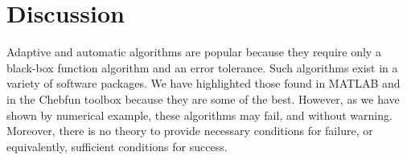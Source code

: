 \documentclass[review]{elsarticle}
\newcommand{\abstol}{\varepsilon}
\theoremstyle{definition}
\newtheorem{exmp}{Example}
\newcommand{\funappxg}{\texttt{funappx\_g}\xspace}
\newcommand{\funming}{\texttt{funmin\_g}\xspace}
\newcommand{\integralg}{\texttt{integral\_g}\xspace}
\begin{document}

\section{Discussion}

Adaptive and automatic algorithms are popular because they require only a
black-box function algorithm and an error tolerance. Such algorithms exist in a
variety of software packages. We have highlighted those found in MATLAB and in
the Chebfun toolbox because they are some of the best. However, as we have shown
by numerical example, these algorithms may fail, and without warning. Moreover,
there is no theory to provide necessary conditions for failure, or equivalently,
sufficient conditions for success.
\end{document}
